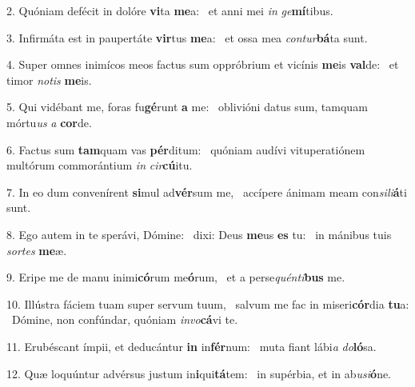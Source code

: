 2. Quóniam defécit in dolóre \textbf{vi}ta \textbf{me}a: \ast\  et anni mei \textit{in} \textit{ge}\textbf{mí}tibus.\

3. Infirmáta est in paupertáte \textbf{vir}tus \textbf{me}a: \ast\  et ossa mea \textit{con}\textit{tur}\textbf{bá}ta sunt.\

4. Super omnes inimícos meos factus sum oppróbrium et vicínis \textbf{me}is \textbf{val}de: \ast\  et timor \textit{no}\textit{tis} \textbf{me}is.\

5. Qui vidébant me, foras fu\textbf{gé}runt \textbf{a} me: \ast\  oblivióni datus sum, tamquam mórtu\textit{us} \textit{a} \textbf{cor}de.\

6. Factus sum \textbf{tam}quam vas \textbf{pér}ditum: \ast\  quóniam audívi vituperatiónem multórum commorántium \textit{in} \textit{cir}\textbf{cú}itu.\

7. In eo dum convenírent \textbf{si}mul ad\textbf{vér}sum me, \ast\  accípere ánimam meam con\textit{si}\textit{li}\textbf{á}ti sunt.\

8. Ego autem in te sperávi, Dómine: \dag\  dixi: Deus \textbf{me}us \textbf{es} tu: \ast\  in mánibus tuis \textit{sor}\textit{tes} \textbf{me}æ.\

9. Eripe me de manu inimi\textbf{có}rum me\textbf{ó}rum, \ast\  et a perse\textit{quén}\textit{ti}\textbf{bus} me.\

10. Illústra fáciem tuam super servum tuum, \dag\  salvum me fac in miseri\textbf{cór}dia \textbf{tu}a: \ast\  Dómine, non confúndar, quóniam \textit{in}\textit{vo}\textbf{cá}vi te.\

11. Erubéscant ímpii, et deducántur \textbf{in} in\textbf{fér}num: \ast\  muta fiant lábi\textit{a} \textit{do}\textbf{ló}sa.\

12. Quæ loquúntur advérsus justum in\textbf{i}qui\textbf{tá}tem: \ast\  in supérbia, et in ab\textit{u}\textit{si}\textbf{ó}ne.\

